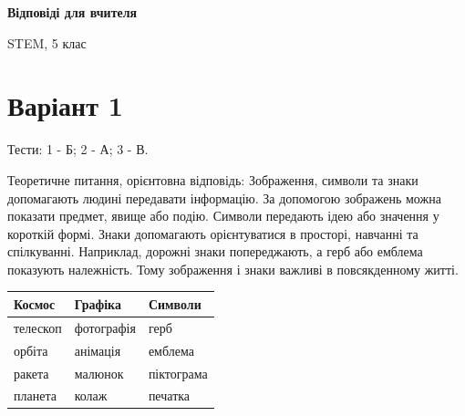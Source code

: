 \documentclass[11pt,a4paper]{article}
\begin{document}
\begin{center}\Large\textbf{Відповіді для вчителя}\par STEM, 5 клас\end{center}

\section*{Варіант 1}

Тести: 1 - Б; 2 - А; 3 - В.\par

Теоретичне питання, орієнтовна відповідь: Зображення, символи та знаки допомагають людині передавати інформацію. За допомогою зображень можна показати предмет, явище або подію. Символи передають ідею або значення у короткій формі. Знаки допомагають орієнтуватися в просторі, навчанні та спілкуванні. Наприклад, дорожні знаки попереджають, а герб або емблема показують належність. Тому зображення і знаки важливі в повсякденному житті.\par

\begin{tabularx}{\linewidth}{|>{\raggedright\arraybackslash}X|>{\raggedright\arraybackslash}X|>{\raggedright\arraybackslash}X|}\hline

\textbf{Космос} & \textbf{Графіка} & \textbf{Символи} \\ \hline

телескоп & фотографія & герб \\ \hline

орбіта & анімація & емблема \\ \hline

ракета & малюнок & піктограма \\ \hline

планета & колаж & печатка \\ \hline

\end{tabularx}\par
\end{document}
